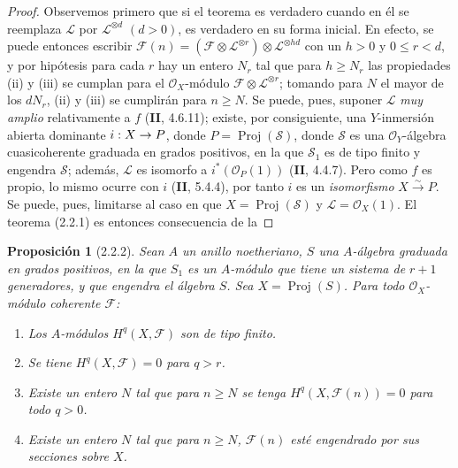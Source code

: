 \documentclass[10pt,oneside,openany]{book}
\theoremstyle{egaenv}\newtheorem*{env}{---}
\theoremstyle{egastatement}
\newtheorem*{proposition}{Proposición}
\theoremstyle{egadescription}
\renewcommand{\leq}{\leqslant}
\renewcommand{\geq}{\geqslant}
\renewcommand{\to}{\mathchoice{\longrightarrow}{\rightarrow}{\rightarrow}{\rightarrow}}
\begin{document}
\begin{proof}
Observemos primero que si el teorema es verdadero cuando en él se reemplaza $\mathcal L$ por $\mathcal L^{\otimes d}$ $(d>0)$, es verdadero en su forma inicial. En efecto, se puede entonces escribir $\mathcal F(n)
=(\mathcal F\otimes\mathcal L^{\otimes r})
\otimes\mathcal L^{\otimes hd}$ con un $h>0$ y $0\leq r<d$, y por hipótesis para cada $r$ hay un entero $N_r$ tal que para $h\geq N_r$ las propiedades (ii) y (iii) se cumplan para el $\mathcal O_X$-módulo $\mathcal F\otimes\mathcal L^{\otimes r}$; tomando para $N$ el mayor de los $dN_r$, (ii) y (iii) se cumplirán para $n\geq N$. Se puede, pues, suponer $\mathcal L$ \emph{muy amplio} relativamente a $f$ (\textbf{II}, 4.6.11); existe, por consiguiente, una $Y$-inmersión abierta dominante $i:X\to P$, donde $P=\operatorname{Proj}(\mathcal S)$, donde $\mathcal S$ es una $\mathcal O_Y$-álgebra cuasicoherente graduada en grados positivos, en la que $\mathcal S_1$ es de tipo finito y engendra $\mathcal S$; además, $\mathcal L$ es isomorfo a $i^*(\mathcal O_P(1))$ (\textbf{II}, 4.4.7). Pero como $f$ es propio, lo mismo ocurre con $i$ (\textbf{II}, 5.4.4), por tanto $i$ es un \emph{isomorfismo} $X\xrightarrow{\sim}P$. Se puede, pues, limitarse al caso en que $X=\operatorname{Proj}(\mathcal S)$ y $\mathcal L=\mathcal O_X(1)$. El teorema (2.2.1) es entonces consecuencia de la
\end{proof}

\begin{proposition}[2.2.2]
\label{III.2.2.2-fr}
Sean $A$ un anillo noetheriano, $S$ una $A$-álgebra graduada en grados positivos, en la que $S_1$ es un $A$-módulo que tiene un sistema de $r+1$ generadores, y que engendra el álgebra $S$. Sea $X=\operatorname{Proj}(S)$. Para todo $\mathcal O_X$-módulo coherente $\mathcal F$:
\begin{enumerate}
\item[{\rm(i)}] Los $A$-módulos $H^q(X,\mathcal F)$ son de tipo finito.
\item[{\rm(ii)}] Se tiene $H^q(X,\mathcal F)=0$ para $q>r$.
\item[{\rm(iii)}] Existe un entero $N$ tal que para $n\geq N$ se tenga $H^q(X,\mathcal F(n))=0$ para todo $q>0$.
\item[{\rm(iv)}] Existe un entero $N$ tal que para $n\geq N$, $\mathcal F(n)$ esté engendrado por sus secciones sobre $X$.
\end{enumerate}
\end{proposition}
\end{document}
